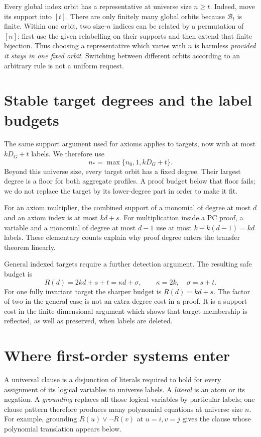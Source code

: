Every global index orbit has a representative at universe size $n\ge t$.
Indeed, move its support into $[t]$. There are only finitely many global
orbits because $\mathcal B_t$ is finite. Within one orbit, two size-$n$
indices can be related by a permutation of $[n]$: first use the given
relabelling on their supports and then extend that finite bijection.
Thus choosing a representative which varies with $n$ is harmless
\emph{provided it stays in one fixed orbit}. Switching between different
orbits according to an arbitrary rule is not a uniform request.

\section{Stable target degrees and the label budgets}\label{tx:sec:target-budgets}
The same support argument used for axioms applies to targets, now with
at most $kD_G+t$ labels. We therefore use
\begin{equation}\label{tx:eq:stable-rank}
                          n_*=\max\{n_0,1,kD_G+t\}.
\end{equation}
Beyond this universe size, every target orbit has a fixed degree. Their largest
degree is a floor for both aggregate profiles. A proof budget below
that floor fails; we do not replace the target by its lower-degree
part in order to make it fit.

For an axiom multiplier, the combined support of a monomial of degree
at most $d$ and an axiom index is at most $kd+s$. For multiplication
inside a PC proof, a variable and a monomial of degree at most $d-1$
use at most $k+k(d-1)=kd$ labels. These elementary counts explain why
proof degree enters the transfer theorem linearly.

General indexed targets require a further detection argument. The
resulting safe budget is
\begin{equation}\label{tx:eq:support-budget}
                R(d)=2kd+s+t=\kappa d+\sigma,
                    \qquad\kappa=2k,\quad\sigma=s+t.
\end{equation}
For one fully invariant target the sharper budget is $R(d)=kd+s$.
The factor of two in the general case is not an extra degree cost in a
proof. It is a support cost in the finite-dimensional argument which
shows that target membership is reflected, as well as preserved, when
labels are deleted.

\section{Where first-order systems enter}
A universal clause is a disjunction of literals required to hold for
every assignment of its logical variables to universe labels. A
\emph{literal} is an atom or its negation. A \emph{grounding} replaces
all those logical variables by particular labels; one clause pattern
therefore produces many polynomial equations at universe size $n$.
For example, grounding $R(u)\vee\neg R(v)$ at $u=i,v=j$ gives the
clause whose polynomial translation appears below.

